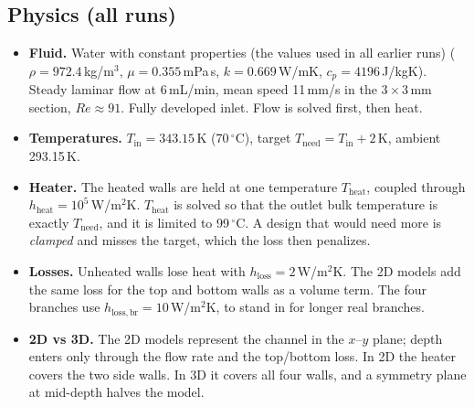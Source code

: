 \documentclass[11pt,a4paper]{article}
\newcommand{\Tneed}{T_\mathrm{need}}
\newcommand{\K}{\ensuremath{\,\mathrm{K}}}
\newcommand{\mm}{\ensuremath{\,\mathrm{mm}}}
\begin{document}
\subsection{Physics (all runs)}
\begin{itemize}
  \item \textbf{Fluid.} Water with constant properties (the values used in all earlier runs) ($\rho = 972.4$\,kg/m$^3$,
        $\mu = 0.355$\,mPa\,s, $k = 0.669$\,W/mK, $c_p = 4196$\,J/kgK). Steady laminar flow at
        6\,mL/min, mean speed 11\,mm/s in the $3\times3\mm$ section, $Re \approx 91$. Fully
        developed inlet. Flow is solved first, then heat.
  \item \textbf{Temperatures.} $T_\mathrm{in} = 343.15\K$ (70\,$^\circ$C), target
        $\Tneed = T_\mathrm{in} + 2\K$, ambient 293.15\K.
  \item \textbf{Heater.} The heated walls are held at one temperature $T_\mathrm{heat}$, coupled
        through $h_\mathrm{heat} = 10^5$\,W/m$^2$K. $T_\mathrm{heat}$ is solved so that the outlet
        bulk temperature is exactly $\Tneed$, and it is limited to 99\,$^\circ$C. A design that would
        need more is \emph{clamped} and misses the target, which the loss then penalizes.
  \item \textbf{Losses.} Unheated walls lose heat with $h_\mathrm{loss} = 2$\,W/m$^2$K. The 2D
        models add the same loss for the top and bottom walls as a volume term. The four branches
        use $h_\mathrm{loss,br} = 10$\,W/m$^2$K, to stand in for longer real branches.
  \item \textbf{2D vs 3D.} The 2D models represent the channel in the $x$--$y$ plane; depth enters
        only through the flow rate and the top/bottom loss. In 2D the heater covers the two side
        walls. In 3D it covers all four walls, and a symmetry plane at mid-depth halves the model.
\end{itemize}
\end{document}
